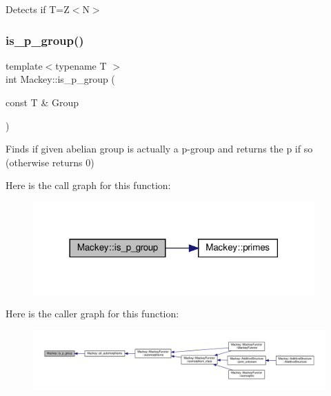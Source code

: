 Detects if T=Z$<$\+N$>$ 

\mbox{\label{namespaceMackey_a2b6ac22efe0be546f2c3f8abc2ceb5b7}} 
\subsubsection{\texorpdfstring{is\+\_\+p\+\_\+group()}{is\_p\_group()}}
{\footnotesize\ttfamily template$<$typename T $>$ \\
int Mackey\+::is\+\_\+p\+\_\+group (\begin{DoxyParamCaption}\item[{const T \&}]{Group }\end{DoxyParamCaption})}



Finds if given abelian group is actually a p-\/group and returns the p if so (otherwise returns 0) 

Here is the call graph for this function\+:\nopagebreak
\begin{figure}[H]
\begin{center}
\leavevmode
\includegraphics[width=306pt]{namespaceMackey_a2b6ac22efe0be546f2c3f8abc2ceb5b7_cgraph}
\end{center}
\end{figure}
Here is the caller graph for this function\+:\nopagebreak
\begin{figure}[H]
\begin{center}
\leavevmode
\includegraphics[width=350pt]{namespaceMackey_a2b6ac22efe0be546f2c3f8abc2ceb5b7_icgraph}
\end{center}
\end{figure}
\mbox{\label{namespaceMackey_aef81f82c080c97bb31154524af52b62c}} 
